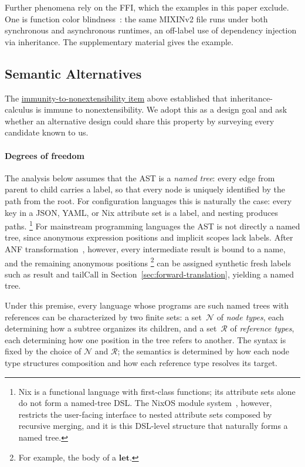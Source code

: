 \label{sec:practical-function-color}%
Further phenomena rely on the FFI, which the examples in this paper
exclude. One is function color
blindness~\cite{nystrom2015-function-color}: the same MIXINv2 file runs
under both synchronous and asynchronous runtimes, an off-label use of
dependency injection via inheritance. The
supplementary material gives the example.

\subsection{Semantic Alternatives}
\label{sec:semantic-variants}

The \hyperref[item:immunity]{immunity-to-nonextensibility item} above established that inheritance-calculus is immune
to nonextensibility.
We adopt this as a design goal and ask whether an alternative
design could share this property
by surveying every candidate known to us.

\paragraph{Degrees of freedom}
The analysis below assumes that the AST is a \emph{named tree}:%
every edge from parent to child carries a label, so that every
node is uniquely identified by the path from the root.
For configuration languages this is naturally the case: every
key in a JSON, YAML, or Nix attribute set is a label, and nesting
produces paths.%
\footnote{
  Nix is a functional language with first-class functions;
  its attribute sets alone do not form a named-tree DSL.
  The NixOS module system~\cite{nixosmodules}, however,
  restricts the user-facing interface to nested attribute sets
  composed by recursive merging, and it is this DSL-level
  structure that naturally forms a named tree.
}
For mainstream programming languages the AST is not directly a
named tree, since anonymous expression positions and implicit
scopes lack labels.
After ANF
transformation~\cite{flanagan1993-essence-compiling-continuations}, however, every intermediate
result is bound to a name, and the remaining anonymous positions%
\footnote{
  For example, the body of a $\mathbf{let}$.
}
can be assigned synthetic
fresh labels such as $\mathrm{result}$ and $\mathrm{tailCall}$
in Section~\ref{sec:forward-translation}, yielding a named
tree.

Under this premise, every language whose programs are such
named trees with references can be characterized by two finite sets:
a set~$\mathcal{N}$ of \emph{node types}, each determining how a
subtree organizes its children, and a set~$\mathcal{R}$ of
\emph{reference types}, each determining how one position in the
tree refers to another.
The syntax is fixed by the choice of $\mathcal{N}$ and
$\mathcal{R}$; the semantics is determined by how each node type
structures composition and how each reference type resolves its
target.

